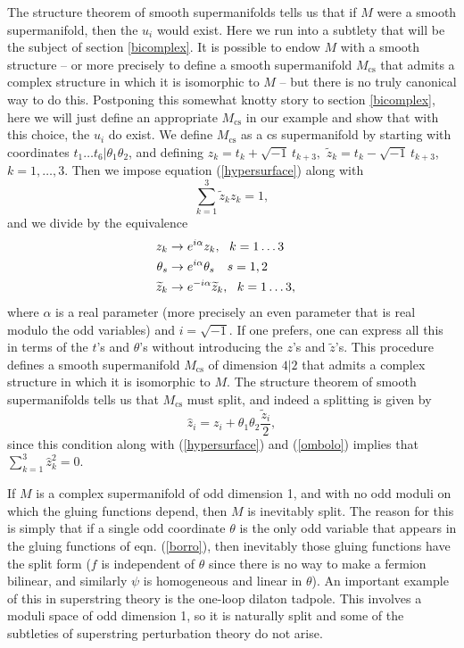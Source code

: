 \documentclass[11pt,a4paper]{article}
\def\t{{ \sf t}}
\def\cs{{\mathrm{cs}}}
\def\hat{\widehat}
\def\tilde{\widetilde}
\def\t{\tilde }
\def\h{\widehat}
\def\tilde{\widetilde}
\begin{document}
The structure theorem of smooth supermanifolds tells us that if $M$ were a smooth
supermanifold, then the $u_i$ would exist.  Here we run into a subtlety that will be
the subject of section \ref{bicomplex}.   It is possible to endow $M$ with a smooth structure --
or more precisely to define a smooth supermanifold $M_{\cs}$ that admits a complex structure
in which it is isomorphic to $M$ -- but there is no truly canonical way to do this.
Postponing this somewhat knotty story to section \ref{bicomplex}, here we will
just define an appropriate $M_\cs$ in our example and show that with this choice, the $u_i$
do exist.  We define $M_\cs$ as a cs supermanifold by starting with coordinates
$t_1\dots t_6|\theta_1\theta_2$, and defining $z_k=t_k+\sqrt{-1}\,t_{k+3},$ 
$\t z_k=t_k-\sqrt{-1} \,t_{k+3}$,
$k=1,\dots,3$.  Then we impose equation (\ref{hypersurface}) along with 
\begin{equation}\label{ombolo} \sum_{k=1}^3 \t z_kz_k=1,\end{equation}
and we divide by the equivalence
\begin{align}\label{zunk} z_k& \to e^{i\alpha}z_k,~~k=1\dots 3 \cr
                                       \theta_s& \to e^{i\alpha}\theta_s~~~s=1,2 \cr
                                        \t z_k&\to e^{-i\alpha}\t z_k,~~k=1\dots 3,\end{align}
  where $\alpha$ is a real parameter (more precisely an even parameter that is real
  modulo the odd variables) and $i=\sqrt{-1}$.   
  If one prefers, one can express all this
  in terms of the $t$'s and $\theta$'s without introducing the $z$'s and $\t z$'s.  This procedure defines a smooth supermanifold
  $M_\cs$ of dimension $4|2$ that admits a complex structure in which it is isomorphic
  to $M$.  The structure theorem of smooth supermanifolds tells us that $M_\cs$ must
  split, and indeed a splitting is given by
   \begin{equation}\label{obolfo}\hat z_i=
   z_i+\theta_1\theta_2 \frac{\t z_i}{2},\end{equation}
   since this condition along with (\ref{hypersurface}) and (\ref{ombolo}) implies that
   $\sum_{k=1}^3\h z_k^2=0$.
      
If $M$ is a complex supermanifold of odd dimension 1, and with no 
odd moduli on which the gluing functions depend, then $M$ is inevitably 
split.  The reason for this is simply
that if a single odd coordinate $\theta$ is the only odd variable that appears 
in the gluing functions of eqn. (\ref{borro}), then inevitably those gluing functions have the split
form ($f$ is independent of $\theta$ since there is no way to make a fermion 
bilinear, and similarly $\psi$ is homogeneous and linear in $\theta$).  
An important example of this in superstring theory is the one-loop dilaton tadpole.
This involves a moduli space of odd dimension 1, so it is naturally 
split and some of the subtleties of superstring perturbation theory do not arise.
\end{document}
